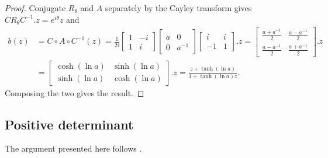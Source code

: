\documentclass[10pt]{amsart}
\numberwithin{equation}{section}     %
\begin{document}
\begin{proof}

Conjugate $R_\theta$ and $A$ separately by the Cayley transform gives $C R_\theta C^{-1}.z = e^{i \theta} z$ and \begin{align*}
    b(z) &= C \circ A \circ C^{-1}(z) 
    = \frac{1}{2i} \begin{bmatrix}
        1 & -i\\ 1 & i
    \end{bmatrix} \begin{bmatrix}
        a & 0 \\ 0 & a^{-1}
    \end{bmatrix} \begin{bmatrix}
        i & i\\ -1 & 1
    \end{bmatrix}.z  = \begin{bmatrix}
        \frac{a + a^{-1}}{2} & \frac{a - a^{-1}}{2} \\
        \frac{a - a^{-1}}{2} & \frac{a + a^{-1}}{2}
    \end{bmatrix}.z \\ &= \begin{bmatrix}
        \cosh(\ln a) & \sinh (\ln a) \\
        \sinh (\ln a) & \cosh ( \ln a)
    \end{bmatrix}.z
   =  \frac{z+\tanh (\ln a)}{1 + \tanh (\ln a) z}.
\end{align*} Composing the two gives the result. 

\end{proof}

\subsection{Positive determinant}
The argument presented here follows \cite{pujals2006expanding}. 
\end{document}
